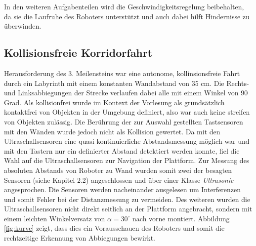 \documentclass[12pt,a4paper,oneside]{article}
\begin{document}
\begin{spacing}{1.15}
In den weiteren Aufgabenteilen wird die Geschwindigkeitsregelung beibehalten, da sie die Laufruhe des Roboters unterstützt und auch dabei hilft Hindernisse zu überwinden.




	
\subsection{Kollisionsfreie Korridorfahrt}

Herausforderung des 3. Meilensteins war eine autonome, kollinsionsfreie Fahrt durch ein Labyrinth mit einem konstanten Wandabstand von 35 cm. Die Rechts- und Linksabbiegungen der Strecke verlaufen dabei alle mit einem Winkel von 90 Grad. Als kollisionfrei wurde im Kontext der Vorlesung als grundsätzlich kontaktfrei von Objekten in der Umgebung definiert, also war auch keine streifen von Objekten zulässig. Die Berührung der zur Auswahl gestellten Tastsensoren mit den Wänden wurde jedoch nicht als Kollision gewertet. Da mit den Ultraschallsensoren eine quasi kontinuierliche Abstandsmessung möglich war und
mit den Tastern nur ein definierter Abstand detektiert werden konnte, fiel die Wahl auf die
Ultraschallsensoren zur Navigation der Plattform. Zur Messung des absoluten Abstands von Roboter zu Wand wurden somit zwei der besagten Sensoren (siehe Kapitel 2.2) angeschlossen und über einer Klasse \textit{Ultrasonic} angesprochen. Die Sensoren werden nacheinander ausgelesen um Interferenzen und somit Fehler bei der Distanzmessung zu vermeiden. Des weiteren wurden die Ultraschallsensoren nicht direkt seitlich an der Plattform angebracht, sondern mit einem leichten Winkelversatz von $\alpha = 30^{\circ}$ nach vorne montiert. Abbildung \ref{fig:kurve} zeigt, dass dies ein Vorausschauen des Roboters und somit die rechtzeitige Erkennung von Abbiegungen bewirkt. 


\end{spacing}
\end{document}
